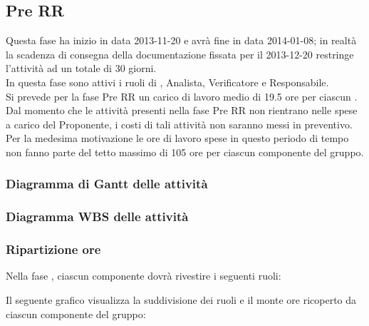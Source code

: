 \subsection{Pre RR}
Questa fase ha inizio in data 2013-11-20 e avrà fine in data 2014-01-08; in realtà la scadenza di consegna della documentazione fissata per il 2013-12-20 restringe l'attività ad un totale di 30 giorni.\\
In questa fase sono attivi i ruoli di , Analista, Verificatore e Responsabile.\\
Si prevede per la fase Pre RR un carico di lavoro medio di 19.5 ore per ciascun .\\
Dal momento che le attività presenti nella fase Pre RR non rientrano nelle spese a carico del Proponente, i costi di tali attività non saranno messi in preventivo.\\
Per la medesima motivazione le ore di lavoro spese in questo periodo di tempo non fanno parte del tetto massimo di 105 ore per ciascun componente del gruppo.

\subsubsection{Diagramma di Gantt delle attività}

\newpage
\subsubsection{Diagramma WBS delle attività}

\newpage
\subsubsection{Ripartizione ore}

\newpage
Nella fase , ciascun componente dovrà rivestire i seguenti ruoli:

Il seguente grafico visualizza la suddivisione dei ruoli e il monte ore ricoperto da ciascun componente del gruppo:

